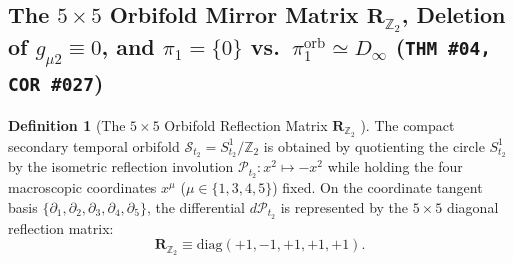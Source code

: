 \documentclass[11pt,a4paper]{article}
\newcommand{\catD}{\text{\textbf{\textcolor{blue!75!black}{[D]}}}}
\theoremstyle{definition}
\newtheorem{definition}[axiom]{Definition}
\theoremstyle{plain}
\theoremstyle{remark}
\begin{document}
\subsection{\texorpdfstring{The $5\times 5$ Orbifold Mirror Matrix $\mathbf{R}_{\mathbb{Z}_2}$, Deletion of $g_{\mu 2} \equiv 0$, and $\pi_1 = \{0\}$ vs.\ $\pi_1^{\mathrm{orb}} \simeq D_\infty$ (\texttt{THM~\#04, COR~\#027})}{The 5x5 Orbifold Mirror Matrix R\_\{Z\_2\}, Deletion of g\_\{mu 2\} = 0, and pi\_1 = \{0\} vs. pi\_1\^orb}}

\begin{definition}[The $5\times 5$ Orbifold Reflection Matrix $\mathbf{R}_{\mathbb{Z}_2}$ \catD]\label{def:c1_rz2_matrix}
The compact secondary temporal orbifold $\mathcal{S}_{t_2} = S^1_{t_2}/\mathbb{Z}_2$ is obtained by quotienting the circle $S^1_{t_2}$ by the isometric reflection involution $\mathcal{P}_{t_2}: x^2 \mapsto -x^2$ while holding the four macroscopic coordinates $x^\mu$ ($\mu \in \{1,3,4,5\}$) fixed. On the coordinate tangent basis $\{\partial_1, \partial_2, \partial_3, \partial_4, \partial_5\}$, the differential $d\mathcal{P}_{t_2}$ is represented by the $5\times 5$ diagonal reflection matrix:
\begin{equation}\label{eq:c1_rz2_def}
\mathbf{R}_{\mathbb{Z}_2} \equiv \mathrm{diag}(+1, -1, +1, +1, +1).
\end{equation}
\end{definition}
\end{document}
